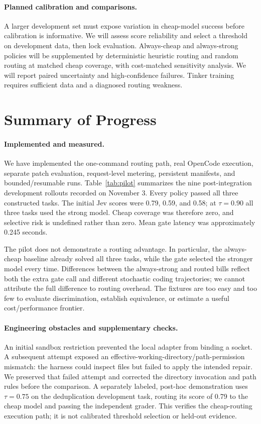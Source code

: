 \documentclass{article}
\begin{document}
\paragraph{Planned calibration and comparisons.}
A larger development set must expose variation in cheap-model success before calibration is informative. We will assess score reliability and select a threshold on development data, then lock evaluation. Always-cheap and always-strong policies will be supplemented by deterministic heuristic routing and random routing at matched cheap coverage, with cost-matched sensitivity analysis. We will report paired uncertainty and high-confidence failures. Tinker training requires sufficient data and a diagnosed routing weakness.

\section{Summary of Progress}

\paragraph{Implemented and measured.}
We have implemented the one-command routing path, real OpenCode execution, separate patch evaluation, request-level metering, persistent manifests, and bounded/resumable runs. Table~\ref{tab:pilot} summarizes the nine post-integration development rollouts recorded on November 3. Every policy passed all three constructed tasks. The initial Jev scores were 0.79, 0.59, and 0.58; at $\tau=0.90$ all three tasks used the strong model. Cheap coverage was therefore zero, and selective risk is undefined rather than zero. Mean gate latency was approximately 0.245 seconds.



The pilot does not demonstrate a routing advantage. In particular, the always-cheap baseline already solved all three tasks, while the gate selected the stronger model every time. Differences between the always-strong and routed bills reflect both the extra gate call and different stochastic coding trajectories; we cannot attribute the full difference to routing overhead. The fixtures are too easy and too few to evaluate discrimination, establish equivalence, or estimate a useful cost/performance frontier.

\paragraph{Engineering obstacles and supplementary checks.}
An initial sandbox restriction prevented the local adapter from binding a socket. A subsequent attempt exposed an effective-working-directory/path-permission mismatch: the harness could inspect files but failed to apply the intended repair. We preserved that failed attempt and corrected the directory invocation and path rules before the comparison. A separately labeled, post-hoc demonstration uses $\tau=0.75$ on the deduplication development task, routing its score of 0.79 to the cheap model and passing the independent grader. This verifies the cheap-routing execution path; it is not calibrated threshold selection or held-out evidence.
\end{document}
